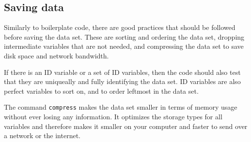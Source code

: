 
\subsection{Saving data}

Similarly to boilerplate code, there are good practices that should be followed before saving the data set.
These are sorting and ordering the data set, dropping intermediate variables that are not needed, and
compressing the data set to save disk space and network bandwidth.

If there is an ID variable or a set of ID variables, then the code should also test that they are uniqueally and
fully identifying the data set. ID
variables are also perfect variables to sort on, and to order leftmost in the data set.

The command \texttt{compress} makes the data set smaller in terms of memory usage without ever losing any
information. It optimizes the storage types for all variables and therefore makes it smaller on your computer
and faster to send over a network or the internet.



\mainmatter
